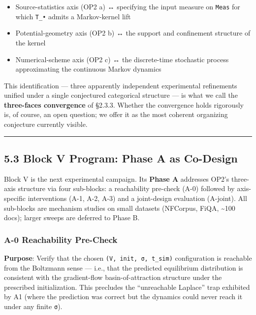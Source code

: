 \documentclass[
]{article}
\providecommand{\tightlist}{%
  \setlength{\itemsep}{0pt}\setlength{\parskip}{0pt}}
\begin{document}
\begin{itemize}
\tightlist
\item
  Source-statistics axis (OP2 a) ↔ specifying the input measure on
  \texttt{Meas} for which \texttt{T\_•} admits a Markov-kernel lift
\item
  Potential-geometry axis (OP2 b) ↔ the support and confinement
  structure of the kernel
\item
  Numerical-scheme axis (OP2 c) ↔ the discrete-time stochastic process
  approximating the continuous Markov dynamics
\end{itemize}

This identification --- three apparently independent experimental
refinements unified under a single conjectured categorical structure ---
is what we call the \textbf{three-faces convergence} of §2.3.3. Whether
the convergence holds rigorously is, of course, an open question; we
offer it as the most coherent organizing conjecture currently visible.

\begin{center}\rule{0.5\linewidth}{0.5pt}\end{center}

\hypertarget{block-v-program-phase-a-as-co-design}{%
\subsection{5.3 Block V Program: Phase A as
Co-Design}\label{block-v-program-phase-a-as-co-design}}

Block V is the next experimental campaign. Its \textbf{Phase A}
addresses OP2's three-axis structure via four sub-blocks: a reachability
pre-check (A-0) followed by axis-specific interventions (A-1, A-2, A-3)
and a joint-design evaluation (A-joint). All sub-blocks are mechanism
studies on small datasets (NFCorpus, FiQA, \textasciitilde100 docs);
larger sweeps are deferred to Phase B.

\hypertarget{a-0-reachability-pre-check}{%
\subsubsection{A-0 Reachability
Pre-Check}\label{a-0-reachability-pre-check}}

\textbf{Purpose}: Verify that the chosen
\texttt{(V,\ init,\ σ,\ t\_sim)} configuration is reachable from the
Boltzmann sense --- i.e., that the predicted equilibrium distribution is
consistent with the gradient-flow basin-of-attraction structure under
the prescribed initialization. This precludes the ``unreachable
Laplace'' trap exhibited by A1 (where the prediction was correct but the
dynamics could never reach it under any finite \texttt{σ}).
\end{document}
